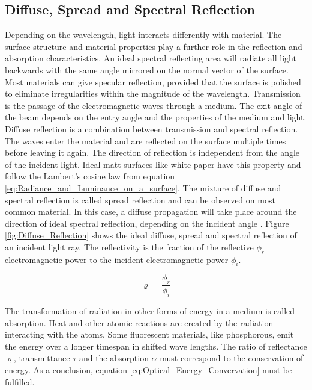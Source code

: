 \subsection{Diffuse, Spread and Spectral Reflection}

Depending on the wavelength, light interacts differently with material. The surface structure and material properties play a further role in the reflection and absorption characteristics. An ideal spectral reflecting area will radiate all light backwards with the same angle mirrored on the normal vector of the surface. Most materials can give specular reflection, provided that the surface is polished to eliminate irregularities within the magnitude of the wavelength. Transmission is the passage of the electromagnetic waves through a medium. The exit angle of the beam depends on the entry angle and the properties of the medium and light. Diffuse reflection is a combination between transmission and spectral reflection. The waves enter the material and are reflected on the surface multiple times before leaving it again. The direction of reflection is independent from the angle of the incident light. Ideal matt surfaces like white paper have this property and follow the Lambert's cosine law from equation \ref{eq:Radiance_and_Luminance_on_a_surface}. The mixture of diffuse and spectral reflection is called spread reflection and can be observed on most common material. In this case, a diffuse propagation will take place around the direction of ideal spectral reflection, depending on the incident angle \cite{hecht1987optik}. Figure \ref{fig:Diffuse_Reflection} shows the ideal diffuse, spread and spectral reflection of an incident light ray. The reflectivity is the fraction of the reflective $\phi_r$ electromagnetic power to the incident electromagnetic power $\phi_i$.

\begin{equation}
\varrho=\frac{\phi_r}{\phi_i}
\end{equation}

\medskip
 The transformation of radiation in other forms of energy in a medium is called absorption. Heat and other atomic reactions are created by the radiation interacting with the atoms. Some fluorescent materials, like phosphorous, emit the energy over a longer timespan in shifted wave lengths. The ratio of reflectance $\varrho$, transmittance $\tau$ and the absorption $\alpha$ must correspond to the conservation of energy. As a conclusion, equation \ref{eq:Optical_Energy_Convervation} must be fulfilled.

